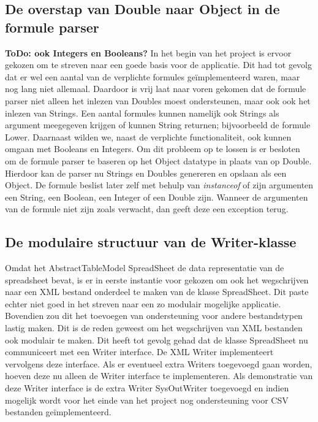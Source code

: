 \documentclass[a4paper,11pt]{article}
\begin{document}
\subsection{De overstap van Double naar Object in de formule parser} \textbf{ToDo: ook Integers en Booleans?}
In het begin van het project is ervoor gekozen om te streven naar een goede basis voor de applicatie. Dit had tot gevolg dat er wel een aantal van de verplichte formules geïmplementeerd waren, maar nog lang niet allemaal. Daardoor is vrij laat naar voren gekomen dat de formule parser niet alleen het inlezen van Doubles moest ondersteunen, maar ook ook het inlezen van Strings. Een aantal formules kunnen namelijk ook Strings als argument meegegeven krijgen of kunnen String returnen; bijvoorbeeld de formule Lower. Daarnaast wilden we, naast de verplichte functionaliteit, ook kunnen omgaan met Booleans en Integers. Om dit probleem op te lossen is er besloten om de formule parser te baseren op het Object datatype in plaats van op Double. Hierdoor kan de parser nu Strings en Doubles genereren en opslaan als een Object. De formule beslist later zelf met behulp van \textit{instanceof} of zijn argumenten een String, een Boolean, een Integer of een Double zijn. Wanneer de argumenten van de formule niet zijn zoals verwacht, dan geeft deze een exception terug.

\subsection{De modulaire structuur van de Writer-klasse}
Omdat het AbstractTableModel SpreadSheet de data representatie van de spreadsheet bevat, is er in eerste instantie voor gekozen om ook het wegschrijven naar een XML bestand onderdeel te maken van de klasse SpreadSheet. Dit paste echter niet goed in het streven naar een zo modulair mogelijke applicatie. Bovendien zou dit het toevoegen van ondersteuning voor andere bestandstypen lastig maken. Dit is de reden geweest om het wegschrijven van XML bestanden ook modulair te maken. Dit heeft tot gevolg gehad dat de klasse SpreadSheet nu communiceert met een Writer interface. De XML Writer implementeert vervolgens deze interface. Als er eventueel extra Writers toegevoegd gaan worden, hoeven deze nu alleen de Writer interface te implementeren. Als demonstratie van deze Writer interface is de extra Writer SysOutWriter toegevoegd en indien mogelijk wordt voor het einde van het project nog ondersteuning voor CSV bestanden geïmplementeerd.
\end{document}
